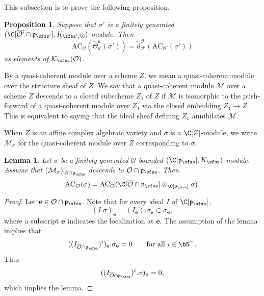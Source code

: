 \documentclass[12pt,a4paper]{amsart}
\newcommand{\CK}{{\mathcal {K}}}
\newcommand{\CM}{{\mathcal {M}}}
\newcommand{\CO}{{\mathcal {O}}}
\newcommand{\p}{\mathfrak p}
\numberwithin{equation}{section}
\newtheorem{lem}[thm]{Lemma}
\newtheorem{prop}[thm]{Proposition}
\theoremstyle{remark}
\begin{document}
This subsection is to prove the following proposition. 
\begin{prop}\label{propthetag}
Suppose that $\sigma'$ is a finitely generated  $(\C[\overline{\CO'}\cap \p_{\sfss'}], K_{\sfss', \C})$-module. Then
\[
\mathrm{AC}_{\CO}( \check \Theta_{\mathsf s'}^{\mathsf s}(\sigma'))= \check \vartheta_{\CO'}^{\CO}(\mathrm{AC}_{\CO'}(\sigma'))
\]
as elements of $\CK_\sfss(\CO)$. 

\end{prop}


By a quasi-coherent module over a scheme $Z$, we mean a quasi-coherent module over the structure sheaf of $Z$. We say that a quasi-coherent module $\CM$ over a scheme $Z$ descends to a closed subscheme $Z_1$ of $Z$ if $\CM$ is isomorphic to the push-forward of a 
 quasi-coherent module over $Z_1$ via the closed embedding $Z_1\rightarrow Z$. This is equivalent to saying that the ideal sheaf defining $Z_1$ annihilates $\CM$. 

When $Z$ is an affine complex algebraic variety and $\sigma$ is a $\C[Z]$-module, 
 we write $\CM_\sigma$ for  the quasi-coherent module over $Z$ corresponding to $\sigma$. 

\begin{lem}\label{geotheta1}
Let $\sigma$ be a finitely generated $\CO$-bounded $(\C[\p_{\sfss}],K_{\sfss})$-module.  Assume that  $(\CM_\sigma)|_{\bar \partial\cap \p_\sfss}$ descends to $\CO\cap \p_\sfss$. Then
\[
  \mathrm{AC}_{\CO}(\sigma)=\mathrm{AC}_{\CO}(\C[\overline \CO\cap \p_{\sfss}]\otimes_{\C[\p_{\sfss}]} \sigma).
\]
\end{lem}
\begin{proof}
Let $\mathbf e\in \CO\cap \p_\sfss$. Note that for every ideal $I$ of $\C[\p_{\sfss}]$, 
\[
  (I.\sigma)_\mathbf e=(I_\mathbf e). \sigma_\mathbf e\subset  \sigma_\mathbf e,
\]
where a subscript $\mathbf e$ indicates the localization at $\mathbf e$. The assumption of the lemma implies that
\[
  ((I_{\overline{\CO}\cap \p_\sfss})^i)_\mathbf e. \sigma_\mathbf e=0\qquad \textrm{for all } i\in \bN^+.
\]
Thus 
\[
  ((I_{\overline{\CO}\cap \p_\sfss})^i. \sigma)_\mathbf e=0,
\]
which implies the  lemma. 
\end{proof}
\end{document}
